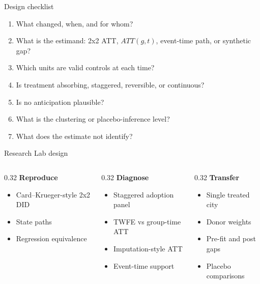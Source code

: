 \documentclass[aspectratio=169,11pt]{beamer}
\newcommand{\1}{\mathbf{1}}
\begin{document}
\begin{frame}{Design checklist}
\begin{enumerate}
    \item What changed, when, and for whom?
    \item What is the estimand: 2x2 ATT, $ATT(g,t)$, event-time path, or synthetic gap?
    \item Which units are valid controls at each time?
    \item Is treatment absorbing, staggered, reversible, or continuous?
    \item Is no anticipation plausible?
    \item What is the clustering or placebo-inference level?
    \item What does the estimate not identify?
\end{enumerate}
\end{frame}

\begin{frame}{Research Lab design}
\begin{columns}[T,onlytextwidth]
\begin{column}{0.32\linewidth}
\textbf{Reproduce}
\begin{itemize}
    \item Card--Krueger-style 2x2 DID
    \item State paths
    \item Regression equivalence
\end{itemize}
\end{column}
\begin{column}{0.32\linewidth}
\textbf{Diagnose}
\begin{itemize}
    \item Staggered adoption panel
    \item TWFE vs group-time ATT
    \item Imputation-style ATT
    \item Event-time support
\end{itemize}
\end{column}
\begin{column}{0.32\linewidth}
\textbf{Transfer}
\begin{itemize}
    \item Single treated city
    \item Donor weights
    \item Pre-fit and post gaps
    \item Placebo comparisons
\end{itemize}
\end{column}
\end{columns}
\end{frame}
\end{document}
